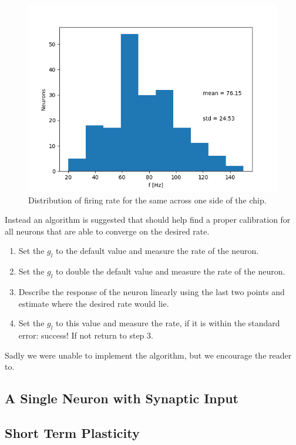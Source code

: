 \documentclass[a4paper]{article}
\begin{document}
\begin{figure}[ht]
    \centering
    \includegraphics[width=\textwidth]{figures/rate-distribution.png}
    \caption{Distribution of firing rate for the same across one side of the
    chip.}
    \label{fig:distribution}
\end{figure}

Instead an algorithm is suggested that should help find a proper calibration for
all neurons that are able to converge on the desired rate.
\begin{enumerate}
    \item Set the $g_l$ to the default value and measure the rate of the neuron.
    \item Set the $g_l$ to double the default value and measure the rate of the
        neuron.
    \item Describe the response of the neuron linearly using the last two
        points and estimate where the desired rate would lie.
    \item Set the $g_l$ to this value and measure the rate, if it is within the
        standard error: success! If not return to step 3.
\end{enumerate}
Sadly we were unable to implement the algorithm, but we encourage the reader
to.

\subsection{A Single Neuron with Synaptic Input}
\subsection{Short Term Plasticity}
\end{document}
